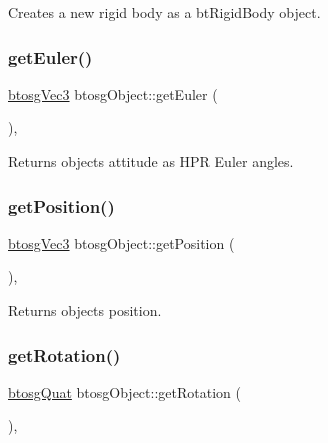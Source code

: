 Creates a new rigid body as a bt\+Rigid\+Body object. \mbox{\label{classbtosgObject_a2019ec63bde02b72600450c7c985e77a}} 
\subsubsection{\texorpdfstring{get\+Euler()}{getEuler()}}
{\footnotesize\ttfamily \hyperlink{classbtosgVec3}{btosg\+Vec3} btosg\+Object\+::get\+Euler (\begin{DoxyParamCaption}{ }\end{DoxyParamCaption})\hspace{0.3cm}{\ttfamily [inline]}, {\ttfamily [inherited]}}

Returns object\textquotesingle{}s attitude as H\+PR Euler angles. \mbox{\label{classbtosgObject_a3dadd5da8f2a312e44a039446b93d4cd}} 
\subsubsection{\texorpdfstring{get\+Position()}{getPosition()}}
{\footnotesize\ttfamily \hyperlink{classbtosgVec3}{btosg\+Vec3} btosg\+Object\+::get\+Position (\begin{DoxyParamCaption}{ }\end{DoxyParamCaption})\hspace{0.3cm}{\ttfamily [inline]}, {\ttfamily [inherited]}}

Returns object\textquotesingle{}s position. \mbox{\label{classbtosgObject_a3b825999ad3a51bde743d4085ff19dae}} 
\subsubsection{\texorpdfstring{get\+Rotation()}{getRotation()}}
{\footnotesize\ttfamily \hyperlink{classbtosgQuat}{btosg\+Quat} btosg\+Object\+::get\+Rotation (\begin{DoxyParamCaption}{ }\end{DoxyParamCaption})\hspace{0.3cm}{\ttfamily [inline]}, {\ttfamily [inherited]}}

